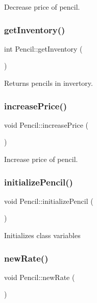 Decrease price of pencil. \mbox{\label{classPencil_aa629f185016565c847bb0a401634f0e5}} 
\subsubsection{\texorpdfstring{get\+Inventory()}{getInventory()}}
{\footnotesize\ttfamily int Pencil\+::get\+Inventory (\begin{DoxyParamCaption}{ }\end{DoxyParamCaption})}

Returns pencils in invertory. \mbox{\label{classPencil_a075683b2e85f8819e71f365c097e5f61}} 
\subsubsection{\texorpdfstring{increase\+Price()}{increasePrice()}}
{\footnotesize\ttfamily void Pencil\+::increase\+Price (\begin{DoxyParamCaption}{ }\end{DoxyParamCaption})}

Increase price of pencil. \mbox{\label{classPencil_a582594d67f32d7cb427f1bbe2824382b}} 
\subsubsection{\texorpdfstring{initialize\+Pencil()}{initializePencil()}}
{\footnotesize\ttfamily void Pencil\+::initialize\+Pencil (\begin{DoxyParamCaption}{ }\end{DoxyParamCaption})}

Initializes class variables \mbox{\label{classPencil_a759af90fe58f6399e831f2c53c0470bd}} 
\subsubsection{\texorpdfstring{new\+Rate()}{newRate()}}
{\footnotesize\ttfamily void Pencil\+::new\+Rate (\begin{DoxyParamCaption}{ }\end{DoxyParamCaption})}

